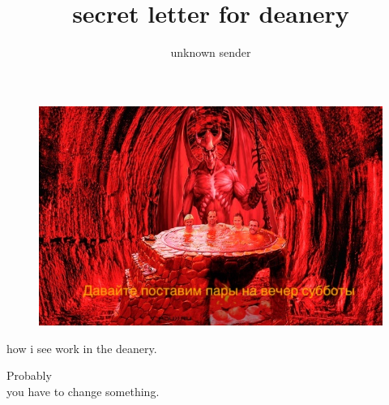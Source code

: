 \documentclass[12pt,a4paper]{article}
\author{unknown sender}
\title{secret letter for deanery}
\date{}
\begin{document}
	\maketitle
\begin{figure}
	\includegraphics[width=\linewidth]{kotel}
\end{figure}


how i see work in the deanery. 



Probably \\
you have to change something.
\end{document}
